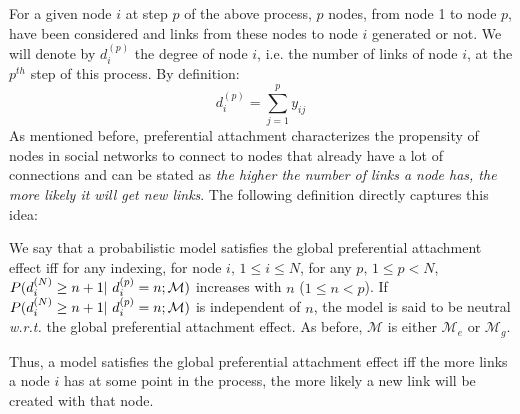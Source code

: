 For a given node $i$ at step $p$ of the above process, $p$ nodes, from node 1 to node $p$, have been considered and links from these nodes to node $i$ generated or not. We will denote by $d_i^{(p)}$ the degree of node $i$, i.e. the number of links of node $i$, at the $p^{th}$ step of this process. By definition:
%
\begin{equation} \label{eq:degree_def}
d_i^{(p)} = \sum_{j=1}^p y_{ij}
\end{equation}
%
As mentioned before, preferential attachment characterizes the propensity of nodes in social networks to connect to nodes that already have a lot of connections and can be stated as \textit{the higher the number of links a node has, the more likely it will get new links}. The following definition directly captures this idea:
%
\begin{definition}
We say that a probabilistic model satisfies the global preferential attachment effect iff for any indexing, for node $i, \, 1 \leq i \leq N$, for any $p, \, 1 \leq p < N$, $P(d_i^{(N)} \geq n+1 | d_i^{(p)} = n; \M)$ increases with $n$ ($1 \leq n < p$). If $P(d_i^{(N)} \geq n+1 | d_i^{(p)} = n; \M)$ is independent of $n$, the model is said to be neutral \textit{w.r.t.} the global preferential attachment effect. As before, $\mathcal{M}$ is either $\mathcal{M}_e$ or $\mathcal{M}_g$.
\end{definition}
%
Thus, a model satisfies the global preferential attachment effect iff the more links a node $i$ has at some point in the process, the more likely a new link will be created with that node.

